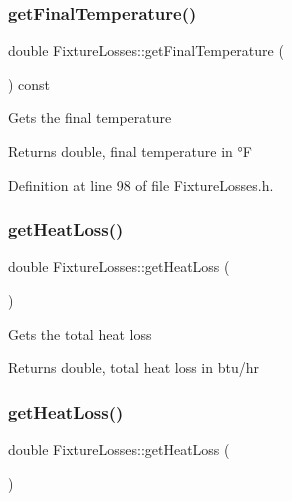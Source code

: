\subsubsection{\texorpdfstring{get\+Final\+Temperature()}{getFinalTemperature()}\hspace{0.1cm}{\footnotesize\ttfamily [3/3]}}
{\footnotesize\ttfamily double Fixture\+Losses\+::get\+Final\+Temperature (\begin{DoxyParamCaption}{ }\end{DoxyParamCaption}) const\hspace{0.3cm}{\ttfamily [inline]}}

Gets the final temperature \begin{DoxyReturn}{Returns}
double, final temperature in °F 
\end{DoxyReturn}


Definition at line 98 of file Fixture\+Losses.\+h.

\mbox{\label{class_fixture_losses_a6829840bdf0607d52adaa9b5ee6ded75}} 
\subsubsection{\texorpdfstring{get\+Heat\+Loss()}{getHeatLoss()}\hspace{0.1cm}{\footnotesize\ttfamily [1/3]}}
{\footnotesize\ttfamily double Fixture\+Losses\+::get\+Heat\+Loss (\begin{DoxyParamCaption}{ }\end{DoxyParamCaption})}

Gets the total heat loss \begin{DoxyReturn}{Returns}
double, total heat loss in btu/hr 
\end{DoxyReturn}
\mbox{\label{class_fixture_losses_a6829840bdf0607d52adaa9b5ee6ded75}} 
\subsubsection{\texorpdfstring{get\+Heat\+Loss()}{getHeatLoss()}\hspace{0.1cm}{\footnotesize\ttfamily [2/3]}}
{\footnotesize\ttfamily double Fixture\+Losses\+::get\+Heat\+Loss (\begin{DoxyParamCaption}{ }\end{DoxyParamCaption})}

